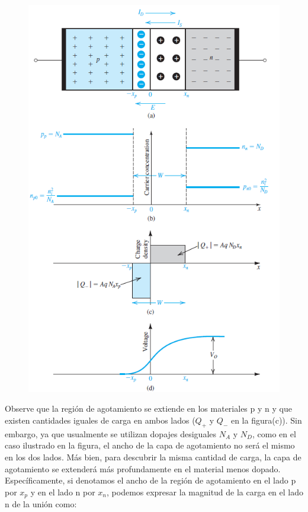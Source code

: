 \begin{figure}[H]
    \centering
    \includegraphics[scale=0.6]{Electronica/pn_f3.png}
\end{figure}

Observe que la región de agotamiento se extiende en los materiales p y n y que existen cantidades iguales de carga en ambos lados ($Q_+$ y $Q_-$ en la figura(c)). Sin embargo, ya que usualmente se utilizan dopajes desiguales \(N_A\) y \(N_D\), como en el caso ilustrado en la figura, el ancho de la capa de agotamiento no será el mismo en los dos lados. Más bien, para descubrir la misma cantidad de carga, la capa de agotamiento se extenderá más profundamente en el material menos dopado. Específicamente, si denotamos el ancho de la región de agotamiento en el lado p por \(x_p\) y en el lado n por \(x_n\), podemos expresar la magnitud de la carga en el lado n de la unión como: 


